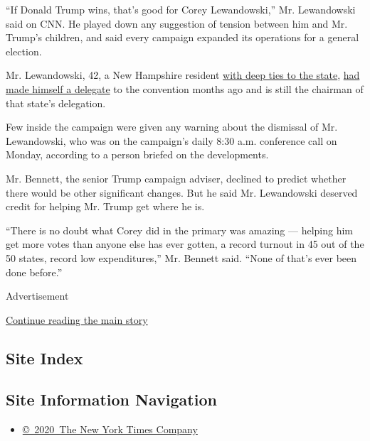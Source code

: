 ``If Donald Trump wins, that's good for Corey Lewandowski,'' Mr.
Lewandowski said on CNN. He played down any suggestion of tension
between him and Mr. Trump's children, and said every campaign expanded
its operations for a general election.

Mr. Lewandowski, 42, a New Hampshire resident
\href{http://www.nytimes.com/2016/04/15/us/politics/corey-lewandowski-trump-history.html}{with
deep ties to the state},
\href{http://www.nytimes.com/politics/first-draft/2016/03/16/donald-trumps-campaign-manager-will-do-double-duty-as-a-delegate/}{had
made himself a delegate} to the convention months ago and is still the
chairman of that state's delegation.

Few inside the campaign were given any warning about the dismissal of
Mr. Lewandowski, who was on the campaign's daily 8:30 a.m. conference
call on Monday, according to a person briefed on the developments.

Mr. Bennett, the senior Trump campaign adviser, declined to predict
whether there would be other significant changes. But he said Mr.
Lewandowski deserved credit for helping Mr. Trump get where he is.

``There is no doubt what Corey did in the primary was amazing ---
helping him get more votes than anyone else has ever gotten, a record
turnout in 45 out of the 50 states, record low expenditures,'' Mr.
Bennett said. ``None of that's ever been done before.''

Advertisement

\protect\hyperlink{after-bottom}{Continue reading the main story}

\hypertarget{site-index}{%
\subsection{Site Index}\label{site-index}}

\hypertarget{site-information-navigation}{%
\subsection{Site Information
Navigation}\label{site-information-navigation}}

\begin{itemize}
\tightlist
\item
  \href{https://help.nytimes.com/hc/en-us/articles/115014792127-Copyright-notice}{©~2020~The
  New York Times Company}
\end{itemize}

